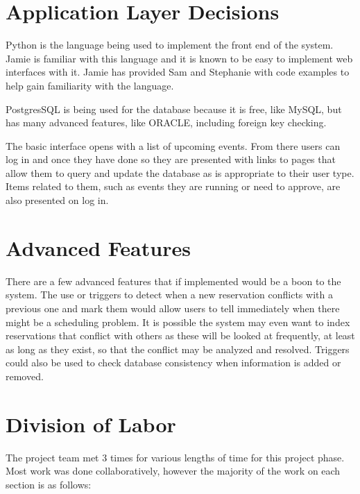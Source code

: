\documentclass{article}
\begin{document}
\section{Application Layer Decisions}
Python is the language being used to implement the front end of the system. Jamie is familiar with this language
and it is known to be easy to implement web interfaces with it. Jamie has provided Sam and Stephanie with code examples
to help gain familiarity with the language.

PostgresSQL is being used for the database because it is free, like MySQL, but has many advanced features, like ORACLE,
including foreign key checking.

The basic interface opens with a list of upcoming events. From there users can log in and once they have done so they are presented
with links to pages that allow them to query and update the database as is appropriate to their user type. Items related to them,
such as events they are running or need to approve, are also presented on log in.

\section{}

\section{}

\section{Advanced Features}
There are a few advanced features that if implemented would be a boon to the system. The use or triggers to detect
when a new reservation conflicts with a previous one and mark them would allow users to tell immediately when there
might be a scheduling problem. It is possible the system may even want to index reservations that conflict with others
as these will be looked at frequently, at least as long as they exist, so that the conflict may be analyzed and resolved.
Triggers could also be used to check database consistency when information is added or removed.

\section{}

\section{Division of Labor}
The project team met 3 times for various lengths of time for this project phase. Most work was done collaboratively,
however the majority of the work on each section is as follows:
\end{document}
